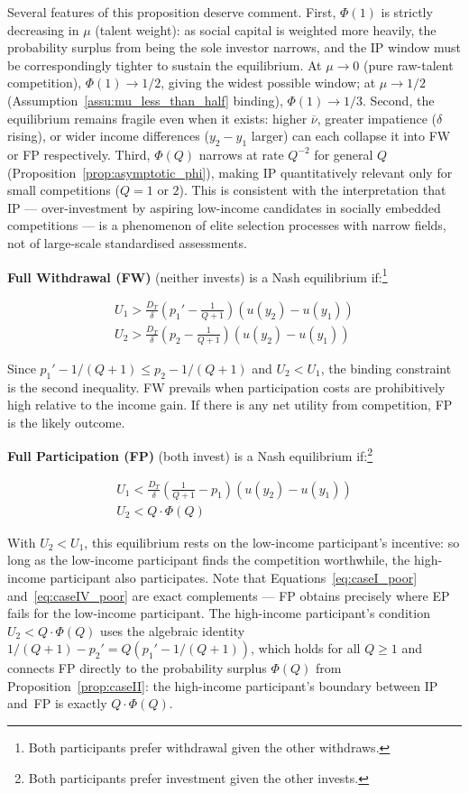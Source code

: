 \documentclass[
    oneside,
    fontsize=10pt,leqno]{article}
\begin{document}
Several features of this proposition deserve comment. First,
$\Phi(1)$ is strictly decreasing in $\mu$ (talent weight): as social capital is
weighted more heavily, the probability surplus from being the sole
investor narrows, and the IP window must be correspondingly
tighter to sustain the equilibrium. At $\mu\to0$ (pure raw-talent
competition), $\Phi(1)\to1/2$, giving the widest possible window;
at $\mu\to1/2$ (Assumption~\ref{assu:mu_less_than_half} binding),
$\Phi(1)\to1/3$. Second, the equilibrium remains fragile even when
it exists: higher $\overline{\nu}$, greater impatience ($\delta$
rising), or wider income differences ($y_{2}-y_{1}$ larger) can each
collapse it into FW or FP respectively.
Third, $\Phi(Q)$ narrows at rate $Q^{-2}$ for general $Q$
(Proposition~\ref{prop:asymptotic_phi}), making IP
quantitatively relevant only for small competitions ($Q=1$ or $2$).
This is consistent with the interpretation that IP ---
over-investment by aspiring low-income candidates in socially
embedded competitions --- is a phenomenon of elite selection
processes with narrow fields, not of large-scale standardised
assessments.

\medskip
\noindent\textbf{Full Withdrawal (FW)} (neither invests) is a Nash equilibrium if:\footnote{Both participants prefer withdrawal given the other withdraws.}

\begin{gather*}
U_{1}>\frac{D_{T}}{\delta}\left(p_{1}'-\frac{1}{Q+1}\right)(u(y_{2})-u(y_{1}))\\
U_{2}>\frac{D_{T}}{\delta}\left(p_{2}-\frac{1}{Q+1}\right)(u(y_{2})-u(y_{1}))
\end{gather*}

Since $p_{1}'-1/(Q+1)\leq p_{2}-1/(Q+1)$ and $U_{2}<U_{1}$, the
binding constraint is the second inequality. FW prevails when
participation costs are prohibitively high relative to the income
gain. If there is any net utility from competition, FP is the
likely outcome.

\medskip
\noindent\textbf{Full Participation (FP)} (both invest) is a Nash equilibrium if:\footnote{Both participants prefer investment given the other invests.}

\begin{gather}
U_{1}<\frac{D_{T}}{\delta}\left(\frac{1}{Q+1}-p_{1}\right)(u(y_{2})-u(y_{1}))\label{eq:caseIV_poor}\\
U_{2}<Q\cdot\Phi(Q)\label{eq:caseIV_rich}
\end{gather}

With $U_{2}<U_{1}$, this equilibrium rests on the low-income participant's
incentive: so long as the low-income participant finds the competition
worthwhile, the high-income participant also participates. Note that
Equations~\ref{eq:caseI_poor} and~\ref{eq:caseIV_poor} are exact
complements --- FP obtains precisely where EP fails for
the low-income participant. The high-income participant's condition
$U_{2}<Q\cdot\Phi(Q)$ uses the algebraic identity
$1/(Q+1)-p_{2}'=Q(p_{1}'-1/(Q+1))$, which holds for all $Q\geq1$
and connects FP directly to the probability surplus $\Phi(Q)$
from Proposition~\ref{prop:caseII}: the high-income participant's boundary
between IP and~FP is exactly $Q\cdot\Phi(Q)$.
\end{document}
